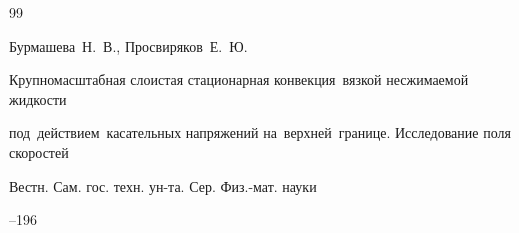 \begin{thebibliography}{99}













\by Бурмашева~Н.~В., Просвиряков~Е.~Ю.

\paper Крупномасштабная слоистая стационарная конвекция~вязкой несжимаемой жидкости

под~действием~касательных напряжений на~верхней~границе. Исследование поля скоростей

\jour Вестн. Сам. гос. техн. ун-та. Сер. Физ.-мат. науки




--196 






















\end{thebibliography}
